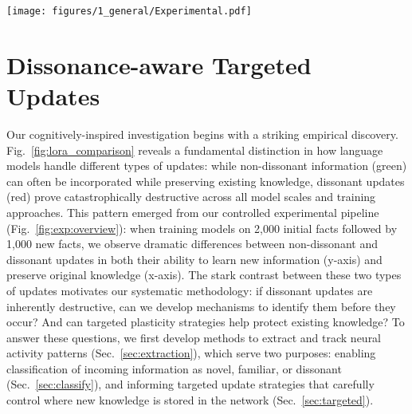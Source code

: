 \begin{figure*}[ht!]
    \centering
    \texttt{[image: figures/1\_general/Experimental.pdf]}
    \caption{Overview of our emprical investigation pipeline (i) Classification pipeline to identify novel, familiar, and dissonant information using inner or output model features. (ii) Targeted update strategies for non-dissonant updates and (iii) dissonant updates.}
    \label{fig:exp:overview}
\end{figure*}

\section{Dissonance-aware Targeted Updates}\label{sec:methodology}
Our cognitively-inspired investigation begins with a striking empirical discovery. Fig.~\ref{fig:lora_comparison} reveals a fundamental distinction in how language models handle different types of updates: while non-dissonant information ({\color{customgreen}green}) can often be incorporated while preserving existing knowledge, dissonant updates ({\color{customred}red}) prove catastrophically destructive across all model scales and training approaches. This pattern emerged from our controlled experimental pipeline (Fig.~\ref{fig:exp:overview}): when training models on 2,000 initial facts followed by 1,000 new facts, we observe dramatic differences between non-dissonant and dissonant updates in both their ability to learn new information (y-axis) and preserve original knowledge (x-axis). The stark contrast between these two types of updates motivates our systematic methodology: if dissonant updates are inherently destructive, can we develop mechanisms to identify them before they occur? And can targeted plasticity strategies help protect existing knowledge? To answer these questions, we first develop methods to extract and track neural activity patterns (Sec.~\ref{sec:extraction}), which serve two purposes: enabling classification of incoming information as novel, familiar, or dissonant (Sec.~\ref{sec:classify}), and informing targeted update strategies that carefully control where new knowledge is stored in the network (Sec.~\ref{sec:targeted}). 


